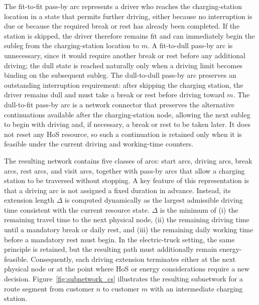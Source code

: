 \documentclass[3p,11pt,authoryear]{elsarticle}  %
\begin{document}
The fit-to-fit pass-by arc represents a driver who reaches the charging-station location in a state that permits further driving, either because no interruption is due or because the required break or rest has already been completed. If the station is skipped, the driver therefore remains fit and can immediately begin the subleg from the charging-station location to \(m\). A fit-to-dull pass-by arc is unnecessary, since it would require another break or rest before any additional driving; the dull state is reached naturally only when a driving limit becomes binding on the subsequent subleg. The dull-to-dull pass-by arc preserves an outstanding interruption requirement: after skipping the charging station, the driver remains dull and must take a break or rest before driving toward \(m\). The dull-to-fit pass-by arc is a network connector that preserves the alternative continuations available after the charging-station node, allowing the next subleg to begin with driving and, if necessary, a break or rest to be taken later. It does not reset any HoS resource, so such a continuation is retained only when it is feasible under the current driving and working-time counters.


The resulting network contains five classes of arcs: start arcs, driving arcs, break arcs, rest arcs, and visit arcs, together with pass-by arcs that allow a charging station to be traversed without stopping. A key feature of this representation is that a driving arc is not assigned a fixed duration in advance. Instead, its extension length \(\Delta\) is computed dynamically as the largest admissible driving time consistent with the current resource state. \(
\Delta
\)
is the minimum of (i) the remaining travel time to the next physical node, (ii) the remaining driving time until a mandatory break or daily rest, and (iii) the remaining daily working time before a mandatory rest must begin. In the electric-truck setting, the same principle is retained, but the resulting path must additionally remain energy-feasible. Consequently, each driving extension terminates either at the next physical node or at the point where HoS or energy considerations require a new decision. Figure~\ref{fig:subnetwork_cs} illustrates the resulting subnetwork for a route segment from customer \(n\) to customer \(m\) with an intermediate charging station.
\end{document}

